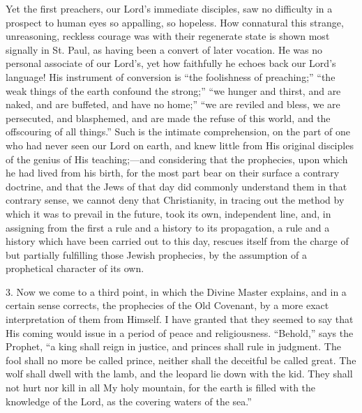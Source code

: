 Yet the first preachers, our Lord's immediate disciples, saw no
difficulty in a prospect to human eyes so appalling, so hopeless. How
connatural this strange, unreasoning, reckless courage was with their
regenerate state is shown most signally in St. Paul, as having been a
convert of later vocation. He was no personal associate of our Lord's,
yet how faithfully he echoes back our Lord's language! His instrument
of conversion is ``the foolishness of preaching;'' ``the
weak things of the earth confound the strong;'' ``we hunger
and thirst, and are naked, and are buffeted, and have no home;''
``we are reviled and bless, we are persecuted, and blasphemed, and
are made the refuse of this world, and the offscouring of all
things.'' Such is the intimate comprehension, on the part of one
who had never seen our Lord on earth, and knew little from His
original disciples of the genius of His teaching;—and
considering that the prophecies, upon which he had lived from his
birth, for the most part bear on their surface a contrary doctrine,
and that the Jews of that day did commonly understand them in that
contrary sense, we cannot deny that Christianity, in tracing out the
method by which it was to prevail in the future, took its own,
independent line, and, in assigning from the first a rule and a
history to its propagation, a rule and a history which have been
carried out to this day, rescues itself from the charge of but
partially fulfilling those Jewish prophecies, by the assumption of a
prophetical character of its own.

3. Now we come to a third point, in which the Divine Master
explains, and in a certain sense corrects, the prophecies of the Old
Covenant, by a more exact interpretation of them from Himself. I have
granted that they seemed to say that His coming would issue in a
period of peace and religiousness. ``Behold,'' says the
Prophet, ``a king shall reign in justice, and princes shall rule
in judgment. The fool shall no more be called prince, neither shall
the deceitful be called great. The wolf shall dwell with the lamb, and
the leopard lie down with the kid. They shall not hurt nor kill in all
My holy mountain, for the earth is filled with the knowledge of the
Lord, as the covering waters of the sea.''

